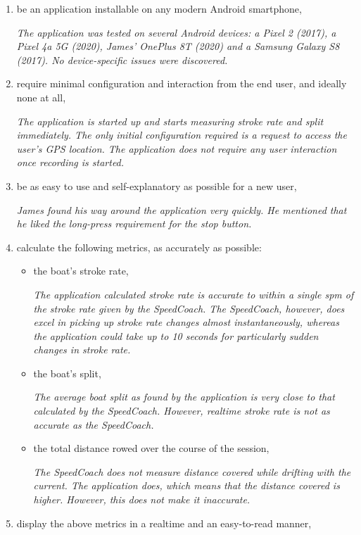 \documentclass[11pt,twoside,a4paper]{report}
\begin{document}
\begin{enumerate}
  \item be an application installable on any modern Android smartphone,
  
  \textit{The application was tested on several Android devices: a Pixel 2 (2017), a Pixel 4a 5G (2020), James' OnePlus 8T (2020) and a Samsung Galaxy S8 (2017). No device-specific issues were discovered.}
  \item require minimal configuration and interaction from the end user, and ideally none at all,
 
  \textit{The application is started up and starts measuring stroke rate and split immediately. The only initial configuration required is a request to access the user's GPS location. The application does not require any user interaction once recording is started.}
  \item be as easy to use and self-explanatory as possible for a new user,
  
  \textit{James found his way around the application very quickly. He mentioned that he liked the long-press requirement for the stop button.}
  \item calculate the following metrics, as accurately as possible:
  \begin{itemize}
    \item the boat's stroke rate,
    
    \textit{The application calculated stroke rate is accurate to within a single spm of the stroke rate given by the SpeedCoach. The SpeedCoach, however, does excel in picking up stroke rate changes almost instantaneously, whereas the application could take up to 10 seconds for particularly sudden changes in stroke rate.}
    \item the boat's split,
    
    \textit{The average boat split as found by the application is very close to that calculated by the SpeedCoach. However, realtime stroke rate is not as accurate as the SpeedCoach.}
    \item the total distance rowed over the course of the session,
    
    \textit{The SpeedCoach does not measure distance covered while drifting with the current. The application does, which means that the distance covered is higher. However, this does not make it inaccurate.}
  \end{itemize}
  \item display the above metrics in a realtime and an easy-to-read manner,
  

\end{enumerate}
\end{document}
